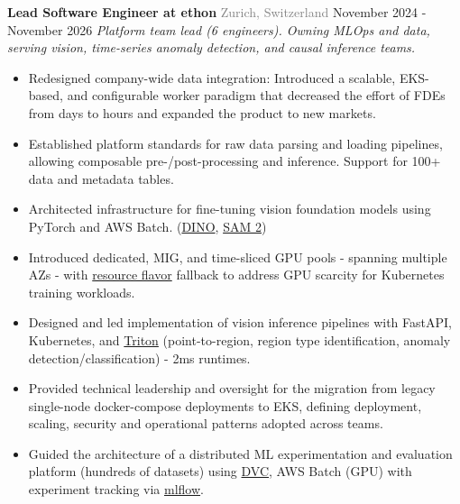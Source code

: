\documentclass{article}
\begin{document}
        \begin{flushleft}
            \textbf{\large Lead Software Engineer at ethon}
            {\footnotesize \textcolor{gray}{Zurich, Switzerland}} \hfill \small November 2024 - November 2026
            \newline
            \textit{Platform team lead (6 engineers). Owning MLOps and data, serving vision, time-series anomaly detection, and causal inference teams.}
            \begin{itemize}[label=\raisebox{0.25ex}{\tiny$\bullet$}, leftmargin=1.5em, labelsep=0.3em]
                \item Redesigned company-wide data integration: Introduced a scalable, EKS-based, and configurable worker paradigm that decreased the effort of FDEs from days to hours and expanded the product to new markets.
                \item Established platform standards for raw data parsing and loading pipelines, allowing composable pre-/post-processing and inference. Support for 100+ data and metadata tables.
                \item Architected infrastructure for fine-tuning vision foundation models using PyTorch and AWS Batch. (\href{https://github.com/facebookresearch/dino}{DINO}, \href{https://github.com/facebookresearch/sam2}{SAM 2})
                \item Introduced dedicated, MIG, and time-sliced GPU pools - spanning multiple AZs - with \href{https://kueue.sigs.k8s.io/docs/concepts/resource_flavor/}{resource flavor} fallback to address GPU scarcity for Kubernetes training workloads.
                \item Designed and led implementation of vision inference pipelines with FastAPI, Kubernetes, and \href{https://docs.nvidia.com/deeplearning/triton-inference-server/user-guide/docs/index.html}{Triton} (point-to-region, region type identification, anomaly detection/classification) - 2ms runtimes.
                \item Provided technical leadership and oversight for the migration from legacy single-node docker-compose deployments to EKS, defining deployment, scaling, security and operational patterns adopted across teams.
                \item Guided the architecture of a distributed ML experimentation and evaluation platform (hundreds of datasets) using \href{https://github.com/treeverse/dvc}{DVC}, AWS Batch (GPU) with experiment tracking via \href{https://mlflow.org/classical-ml/experiment-tracking/}{mlflow}.

\end{itemize}
\end{flushleft}
\end{document}
